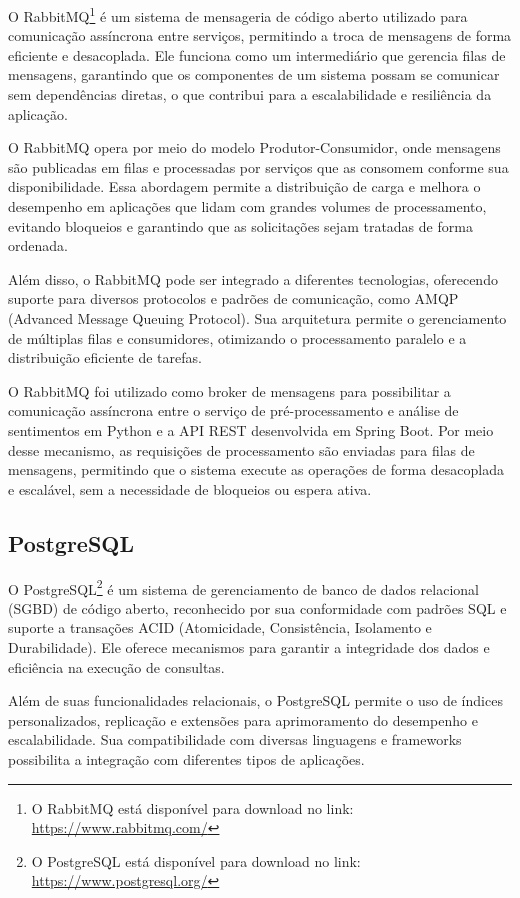 \documentclass[
	12pt,				%
	oneside,			%
	a4paper,			%
	english,			%
	french,				%
	spanish,			%
	brazil				%
	]{abntex2}
\begin{document}
O RabbitMQ\footnote{O RabbitMQ está disponível para download no link:
  \url{https://www.rabbitmq.com/}} é um sistema de mensageria de código
aberto utilizado para comunicação assíncrona entre serviços, permitindo
a troca de mensagens de forma eficiente e desacoplada. Ele funciona como
um intermediário que gerencia filas de mensagens, garantindo que os
componentes de um sistema possam se comunicar sem dependências diretas,
o que contribui para a escalabilidade e resiliência da aplicação.

O RabbitMQ opera por meio do modelo Produtor-Consumidor, onde mensagens
são publicadas em filas e processadas por serviços que as consomem
conforme sua disponibilidade. Essa abordagem permite a distribuição de
carga e melhora o desempenho em aplicações que lidam com grandes volumes
de processamento, evitando bloqueios e garantindo que as solicitações
sejam tratadas de forma ordenada.

Além disso, o RabbitMQ pode ser integrado a diferentes tecnologias,
oferecendo suporte para diversos protocolos e padrões de comunicação,
como AMQP (Advanced Message Queuing Protocol). Sua arquitetura permite o
gerenciamento de múltiplas filas e consumidores, otimizando o
processamento paralelo e a distribuição eficiente de tarefas.

O RabbitMQ foi utilizado como broker de mensagens para possibilitar a
comunicação assíncrona entre o serviço de pré-processamento e análise de
sentimentos em Python e a API REST desenvolvida em Spring Boot. Por meio
desse mecanismo, as requisições de processamento são enviadas para filas
de mensagens, permitindo que o sistema execute as operações de forma
desacoplada e escalável, sem a necessidade de bloqueios ou espera ativa.

\hypertarget{postgresql}{%
\subsection{PostgreSQL}\label{postgresql}}

O PostgreSQL\footnote{O PostgreSQL está disponível para download no
  link: \url{https://www.postgresql.org/}} é um sistema de gerenciamento
de banco de dados relacional (SGBD) de código aberto, reconhecido por
sua conformidade com padrões SQL e suporte a transações ACID
(Atomicidade, Consistência, Isolamento e Durabilidade). Ele oferece
mecanismos para garantir a integridade dos dados e eficiência na
execução de consultas.

Além de suas funcionalidades relacionais, o PostgreSQL permite o uso de
índices personalizados, replicação e extensões para aprimoramento do
desempenho e escalabilidade. Sua compatibilidade com diversas linguagens
e frameworks possibilita a integração com diferentes tipos de
aplicações.
\end{document}
